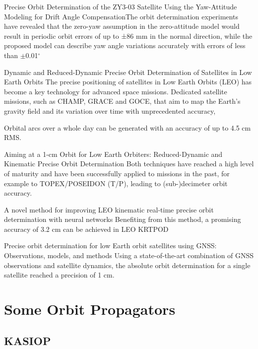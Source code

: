 \documentclass[a4paper,10pt]{article}
\begin{document}
Precise Orbit Determination of the ZY3-03
Satellite Using the Yaw-Attitude Modeling
for Drift Angle CompensationThe orbit determination experiments have revealed that the zero-yaw assumption in the zero-attitude model would result in periodic orbit errors of up to ±86 mm in the normal direction, while
the proposed model can describe yaw angle variations accurately with errors of less than $\pm$0.01$^\circ$


Dynamic and Reduced-Dynamic Precise Orbit
Determination of Satellites in Low Earth Orbits
The precise positioning of satellites in Low Earth Orbits (LEO) has become a key technology
for advanced space missions. Dedicated satellite missions, such as CHAMP, GRACE and
GOCE, that aim to map the Earth’s gravity field and its variation over time with
unprecedented accuracy,

Orbital arcs over a whole day can be generated with an
accuracy of up to 4.5 cm RMS. 


Aiming at a 1-cm Orbit for Low Earth Orbiters: Reduced-Dynamic and Kinematic Precise Orbit Determination
Both techniques have reached a high level of maturity and have been successfully applied to missions in the past, for example to TOPEX/POSEIDON (T/P), leading to (sub-)decimeter orbit accuracy.

A novel method for improving LEO kinematic real-time precise orbit determination with neural networks
Benefiting from this method, a promising accuracy of 3.2 cm can be achieved in LEO KRTPOD


Precise orbit determination for low Earth orbit satellites using GNSS: Observations, models, and methods
Using a state-of-the-art combination of GNSS observations and satellite dynamics, the absolute orbit determination for a single satellite reached a precision of 1 cm.

\section{Some Orbit Propagators}

\subsection{KASIOP}

\end{document}
